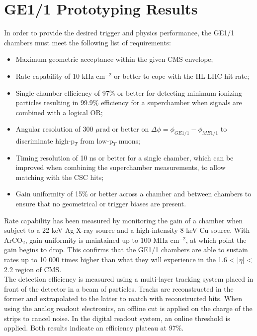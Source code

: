   \section{GE1/1 Prototyping Results}

    In order to provide the desired trigger and physics performance, the GE1/1 chambers must meet the following list of requirements:
    \begin{itemize}
      \item Maximum geometric acceptance within the given CMS envelope;
      \item Rate capability of 10 kHz cm$^{-2}$ or better to cope with the HL-LHC hit rate;
      \item Single-chamber efficiency of 97\% or better for detecting minimum ionizing particles resulting in 99.9\% efficiency for a superchamber when signals are combined with a logical OR;
      \item Angular resolution of 300 $\mu$rad or better on $ \Delta \phi = \phi_{GE1/1} - \phi_{ME1/1} $ to discriminate high-p$_T$ from low-p$_T$ muons;
      \item Timing resolution of 10 ns or better for a single chamber, which can be improved when combining the superchamber measurements, to allow matching with the CSC hits;
      \item Gain uniformity of 15\% or better across a chamber and between chambers to ensure that no geometrical or trigger biases are present. \\
    \end{itemize}

    Rate capability has been measured by monitoring the gain of a chamber when subject to a 22 keV Ag X-ray source and a high-intensity 8 keV Cu source. With ArCO$_2$, gain uniformity is maintained up to 100 MHz cm$^{-2}$, at which point the gain begins to drop. This confirms that the GE1/1 chambers are able to sustain rates up to 10 000 times higher than what they will experience in the 1.6 < |$\eta$| < 2.2 region of CMS. \\

    The detection efficiency is measured using a multi-layer tracking system placed in front of the detector in a beam of particles. Tracks are reconstructed in the former and extrapolated to the latter to match with reconstructed hits. When using the analog readout electronics, an offline cut is applied on the charge of the strips to cancel noise. In the digital readout system, an online threshold is applied. Both results indicate an efficiency plateau at 97\%. \\

